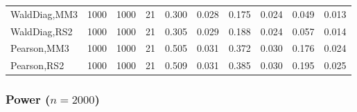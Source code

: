 \documentclass[
]{article}
\begin{document}
\begin{table}[H]
{\begin{tabular}[t]{lrrrrrrlrr}
\hspace{1em}WaldDiag,MM3 & 1000 & 1000 & 21 & 0.300 & 0.028 & 0.175 & 0.024 & 0.049 & 0.013\\
\hspace{1em}WaldDiag,RS2 & 1000 & 1000 & 21 & 0.305 & 0.029 & 0.188 & 0.024 & 0.057 & 0.014\\
\hspace{1em}Pearson,MM3 & 1000 & 1000 & 21 & 0.505 & 0.031 & 0.372 & 0.030 & 0.176 & 0.024\\
\hspace{1em}Pearson,RS2 & 1000 & 1000 & 21 & 0.509 & 0.031 & 0.385 & 0.030 & 0.195 & 0.025\\
\bottomrule
\end{tabular}}
\endgroup{}
\end{table}

\hypertarget{power-n2000-2}{%
\subsubsection{\texorpdfstring{Power
(\(n=2000\))}{Power (n=2000)}}\label{power-n2000-2}}
\end{document}
